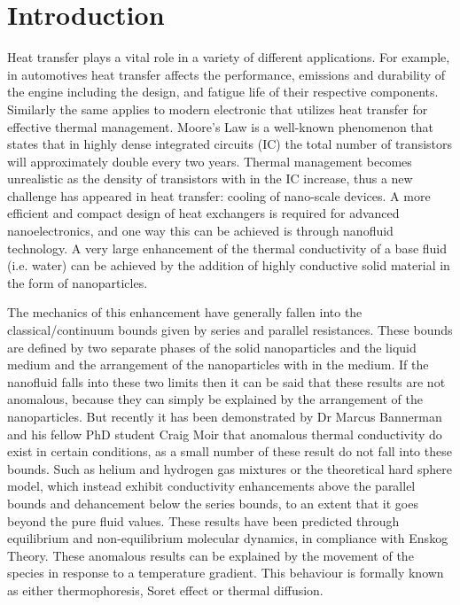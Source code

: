\documentclass[12pt,MEng]{UoAThesis}
\begin{document}
\chapter{Introduction}
Heat transfer plays a vital role in a variety of different applications. For example, in automotives heat transfer affects the performance, emissions and durability of the engine including the design, and fatigue life of their respective components. Similarly the same applies to modern electronic that utilizes heat transfer for effective thermal management. Moore's Law is a well-known phenomenon that states that in highly dense integrated circuits (IC) the total number of transistors will approximately double every two years. Thermal management becomes unrealistic as the density of transistors with in the IC increase, thus a new challenge has appeared in heat transfer: cooling of nano-scale devices. A more efficient and compact design of heat exchangers is required for advanced nanoelectronics, and one way this can be achieved is through nanofluid technology. A very large enhancement of the thermal conductivity of a base fluid (i.e. water) can be achieved by the addition of highly conductive solid material in the form of nanoparticles. 

The mechanics of this enhancement have generally fallen into the classical/continuum bounds given by series and parallel resistances. These bounds are defined by two separate phases of the solid nanoparticles and the liquid medium and the arrangement of the nanoparticles with in the medium. If the nanofluid falls into these two limits then it can be said that these results are not anomalous, because they can simply be explained by the arrangement of the nanoparticles. But recently it has been demonstrated by Dr Marcus Bannerman and his fellow PhD student Craig Moir that anomalous thermal conductivity do exist in certain conditions, as a small number of these result do not fall into these bounds. Such as helium and hydrogen gas mixtures or the theoretical hard sphere model, which instead exhibit conductivity enhancements above the parallel bounds and dehancement below the series bounds, to an extent that it goes beyond the pure fluid values. These results have been predicted through equilibrium and non-equilibrium molecular dynamics, in compliance with Enskog Theory. These anomalous results can be explained by the movement of the species  in response to a temperature gradient. This behaviour is formally known as either thermophoresis, Soret effect or thermal diffusion. 
\end{document}
